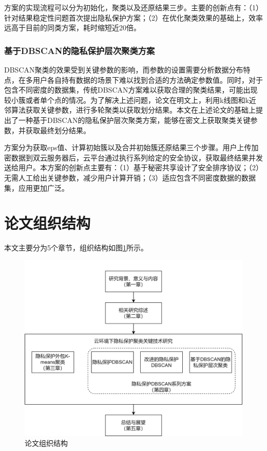 方案的实现流程可以分为初始化，聚类以及还原结果三步。主要的创新点有：（1）针对结果稳定性问题首次提出隐私保护方案；（2）在优化聚类效果的基础上，效率远高于目前的同类方案\cite{bozdemir2021privacy}，耗时缩短近20倍。

\subsubsection{基于DBSCAN的隐私保护层次聚类方案}
DBSCAN聚类的效果受到关键参数的影响，而参数的设置需要分析数据分布特点，在多用户各自持有数据的场景下难以找到合适的方法确定参数值。同时，对于包含不同密度的数据集，传统DBSCAN方案难以获取合理的聚类结果，可能出现较小簇或者单个点的情况。为了解决上述问题，论文\cite{latifi2021dbhc}在明文上，利用k线图和k近邻算法获取关键参数，进行多轮聚类以获取划分结果。本文在上述论文的基础上提出了一种基于DBSCAN的隐私保护层次聚类方案，能够在密文上获取聚类关键参数，并获取最终划分结果。

方案分为获取eps值、计算初始簇以及合并初始簇还原结果三个步骤。用户上传加密数据到双云服务器后，云平台通过执行系列给定的安全协议，获取最终结果并发送给用户。本方案的创新点主要有：（1）基于秘密共享设计了安全排序协议；（2）无需人工给出关键参数，减少用户计算开销；（3）适应包含不同密度数据的数据集，应用更加广泛。

\section{论文组织结构}

本文主要分为5个章节，组织结构如图\ref{lunwenjiegou}所示。
\begin{figure}[htbp]
	\centering
	\includegraphics[scale=0.9]{img/dd.png}%
	\caption{论文组织结构}
	\label{lunwenjiegou}
\end{figure}

